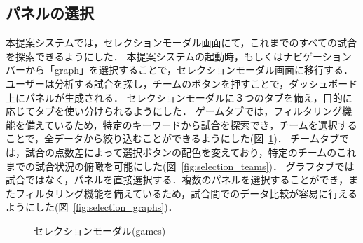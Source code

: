 \documentclass[sotsuron]{kuee}
\begin{document}
		\subsection{パネルの選択}
			本提案システムでは，セレクションモーダル画面にて，これまでのすべての試合を探索できるようにした．
			本提案システムの起動時，もしくはナビゲーションバーから「graph」を選択することで，セレクションモーダル画面に移行する．
			ユーザーは分析する試合を探し，チームのボタンを押すことで，ダッシュボード上にパネルが生成される．
			セレクションモーダルに３つのタブを備え，目的に応じてタブを使い分けられるようにした．
			ゲームタブでは，フィルタリング機能を備えているため，特定のキーワードから試合を探索でき，チームを選択することで，全データから絞り込むことができるようにした(図~\ref{fig:selection_games})．
			チームタブでは，試合の点数差によって選択ボタンの配色を変えており，特定のチームのこれまでの試合状況の俯瞰を可能にした(図~\ref{fig:selection_teams})．
			グラフタブでは試合ではなく，パネルを直接選択する．複数のパネルを選択することができ，またフィルタリング機能を備えているため，試合間でのデータ比較が容易に行えるようにした(図~\ref{fig:selection_graphs})．
			\begin{figure}
				\begin{center}
				\end{center}
				\caption{セレクションモーダル(games)}
		  		\label{fig:selection_games}
			\end{figure}
\end{document}
